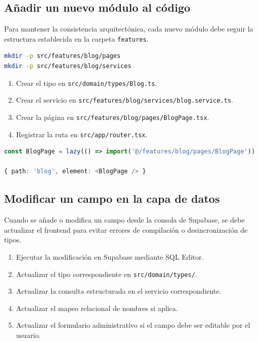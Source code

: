 \documentclass[12pt,letterpaper]{article}
\newcommand{\code}[1]{\nolinkurl{#1}}
\begin{document}
\subsection{Añadir un nuevo módulo al código}

Para mantener la consistencia arquitectónica, cada nuevo módulo debe seguir la estructura establecida en la carpeta \code{features}.

\begin{lstlisting}[language=bash]
mkdir -p src/features/blog/pages
mkdir -p src/features/blog/services
\end{lstlisting}

\begin{enumerate}
    \item Crear el tipo en \code{src/domain/types/Blog.ts}.
    \item Crear el servicio en \code{src/features/blog/services/blog.service.ts}.
    \item Crear la página en \code{src/features/blog/pages/BlogPage.tsx}.
    \item Registrar la ruta en \code{src/app/router.tsx}.
\end{enumerate}

\begin{lstlisting}[language=typescript]
const BlogPage = lazy(() => import('@/features/blog/pages/BlogPage'))

{ path: 'blog', element: <BlogPage /> }
\end{lstlisting}

\subsection{Modificar un campo en la capa de datos}

Cuando se añade o modifica un campo desde la consola de Supabase, se debe actualizar el frontend para evitar errores de compilación o desincronización de tipos.

\begin{enumerate}
    \item Ejecutar la modificación en Supabase mediante SQL Editor.
    \item Actualizar el tipo correspondiente en \code{src/domain/types/}.
    \item Actualizar la consulta estructurada en el servicio correspondiente.
    \item Actualizar el mapeo relacional de nombres si aplica.
    \item Actualizar el formulario administrativo si el campo debe ser editable por el usuario.
\end{enumerate}
\end{document}
